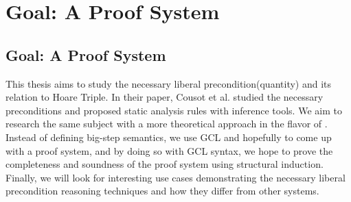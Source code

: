\chapter{Goal: A Proof System}\label{ch:goal} %

\section{Goal: A Proof System}
This thesis aims to study the necessary liberal precondition(quantity) and its relation to Hoare Triple. 
In their paper, Cousot et al. studied the necessary preconditions and proposed static analysis rules with inference tools.
We aim to research the same subject with a more theoretical approach in the flavor of \cite{Vries2011}.
Instead of defining big-step semantics, we use GCL and hopefully to come up with a proof system,
and by doing so with GCL syntax, we hope to prove the completeness and soundness of the proof system using structural induction.
Finally, we will look for interesting use cases demonstrating the necessary liberal precondition reasoning techniques and how they differ from other systems.


